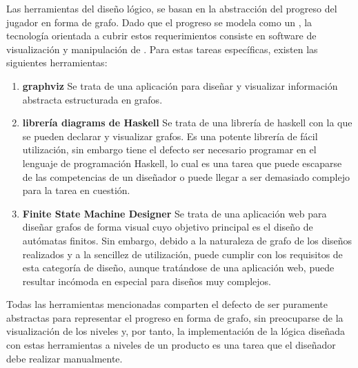 Las herramientas del diseño lógico, se basan en la abstracción del progreso del jugador en forma de grafo.
Dado que el progreso se modela como un , la tecnología orientada a cubrir estos requerimientos consiste en software de visualización y manipulación de . Para estas tareas específicas, existen las siguientes herramientas:
\begin{enumerate}
	\item \textbf{graphviz\cite{graphviz}} Se trata de una aplicación para diseñar y visualizar información abstracta estructurada en grafos.
	\item \textbf{librería diagrams de Haskell\cite{haskell-diagrams}} Se trata de una librería de haskell con la que se pueden declarar y visualizar grafos. Es una potente librería de fácil utilización, sin embargo tiene el defecto ser necesario programar en el lenguaje de programación Haskell, lo cual es una tarea que puede escaparse de las competencias de un diseñador o puede llegar a ser demasiado complejo para la tarea en cuestión.
	\item \textbf{Finite State Machine Designer\cite{finite-state-machine-designer}} Se trata de una aplicación web para diseñar grafos de forma visual cuyo objetivo principal es el diseño de autómatas finitos. Sin embargo, debido a la naturaleza de grafo de los diseños realizados y a la sencillez de utilización, puede cumplir con los requisitos de esta categoría de diseño, aunque tratándose de una aplicación web, puede resultar incómoda en especial para diseños muy complejos.
\end{enumerate}
Todas las herramientas mencionadas comparten el defecto de ser puramente abstractas para representar el progreso en forma de grafo, sin preocuparse de la visualización de los niveles y, por tanto, la implementación de la lógica diseñada con estas herramientas a niveles de un producto es una tarea que el diseñador debe realizar manualmente.